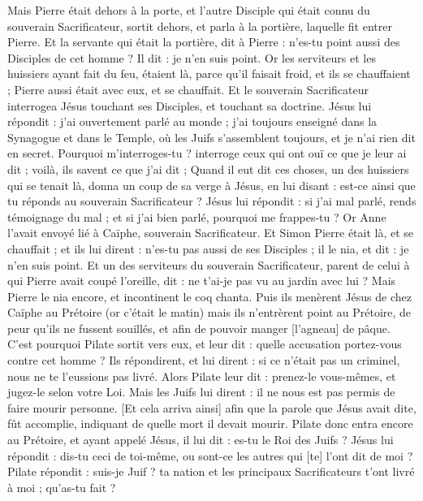 \begin{multicols}{2}
Mais Pierre était dehors à la porte, et l'autre Disciple qui était connu du souverain Sacrificateur, sortit dehors, et parla à la portière, laquelle fit entrer Pierre.
Et la servante qui était la portière, dit à Pierre : n'es-tu point aussi des Disciples de cet homme ? Il dit : je n'en suis point.
Or les serviteurs et les huissiers ayant fait du feu, étaient là, parce qu'il faisait froid, et ils se chauffaient ; Pierre aussi était avec eux, et se chauffait.
Et le souverain Sacrificateur interrogea Jésus touchant ses Disciples, et touchant sa doctrine.
Jésus lui répondit : j'ai ouvertement parlé au monde ; j'ai toujours enseigné dans la Synagogue et dans le Temple, où les Juifs s'assemblent toujours, et je n'ai rien dit en secret.
Pourquoi m'interroges-tu ? interroge ceux qui ont ouï ce que je leur ai dit ; voilà, ils savent ce que j'ai dit ;
Quand il eut dit ces choses, un des huissiers qui se tenait là, donna un coup de sa verge à Jésus, en lui disant : est-ce ainsi que tu réponds au souverain Sacrificateur ?
Jésus lui répondit : si j'ai mal parlé, rends témoignage du mal ; et si j'ai bien parlé, pourquoi me frappes-tu ?
Or Anne l'avait envoyé lié à Caïphe, souverain Sacrificateur.
Et Simon Pierre était là, et se chauffait ; et ils lui dirent : n'es-tu pas aussi de ses Disciples ; il le nia, et dit : je n'en suis point.
Et un des serviteurs du souverain Sacrificateur, parent de celui à qui Pierre avait coupé l'oreille, dit : ne t'ai-je pas vu au jardin avec lui ?
Mais Pierre le nia encore, et incontinent le coq chanta.
Puis ils menèrent Jésus de chez Caïphe au Prétoire (or c'était le matin) mais ils n'entrèrent point au Prétoire, de peur qu'ils ne fussent souillés, et afin de pouvoir manger [l'agneau] de pâque.
C'est pourquoi Pilate sortit vers eux, et leur dit : quelle accusation portez-vous contre cet homme ?
Ils répondirent, et lui dirent : si ce n'était pas un criminel, nous ne te l'eussions pas livré.
Alors Pilate leur dit : prenez-le vous-mêmes, et jugez-le selon votre Loi. Mais les Juifs lui dirent : il ne nous est pas permis de faire mourir personne.
[Et cela arriva ainsi] afin que la parole que Jésus avait dite, fût accomplie, indiquant de quelle mort il devait mourir.
Pilate donc entra encore au Prétoire, et ayant appelé Jésus, il lui dit : es-tu le Roi des Juifs ?
Jésus lui répondit : dis-tu ceci de toi-même, ou sont-ce les autres qui [te] l'ont dit de moi ?
Pilate répondit : suis-je Juif ? ta nation et les principaux Sacrificateurs t'ont livré à moi ; qu'as-tu fait ?

\end{multicols}
